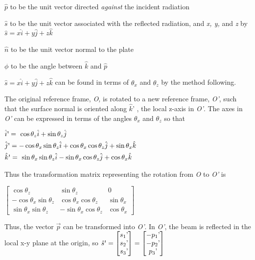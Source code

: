         $\hat{p}$ to be the unit vector directed \textit{against }the
         incident radiation

         $\hat{s}$ to be the unit vector associated with the reflected
         radiation, and \textit{x, y, }and\textit{ z }by
         $\hat{s}=x\hat{i}+y\hat{j}+z\hat{k}$

         $\hat{n}$ to be the unit vector normal to the plate

         $\phi $ to be the angle between  $\hat{k}$
         and $\hat{p}$

         $\hat{s}=x\hat{i}+y\hat{j}+z\hat{k}$ can be found in terms of  $\theta
         _{x}$ and  $\theta _{z}$ by the method following.

         \bigskip

         The original reference frame, \textit{O,} is rotated to a new
         reference frame, \textit{O'}, such that the surface normal is
         oriented along $\hat{k}\text{'}$ , the local z{}-axis in
         \textit{O'}.  The axes in
         \textit{O'} can be expressed in terms of the
         angles $\theta _{x}$ and  $\theta _{z}$ so that

         $\begin{gathered}\hat{i}\text{{\textquotesingle}}=\ \cos \theta
         _{z}\hat{i}+\sin \theta _{z}\hat{j}\hfill
         \\\hat{j}\text{{\textquotesingle}}=-\cos \theta _{x}\sin \theta
         _{z}\hat{i}+\cos \theta _{x}\cos \theta _{z}\hat{j}+\sin \theta
         _{x}\hat{k}\hfill \\\hat{k}\text{{\textquotesingle}}=\ \sin \theta
         _{x}\sin \theta _{z}\hat{i}-\sin \theta _{x}\cos \theta
         _{z}\hat{j}+\cos \theta _{x}\hat{k}\hfill \end{gathered}$

         Thus the transformation matrix representing the rotation from
         \textit{O} to \textit{O'} is

         $\left[\begin{matrix}\cos \theta _{z}&\sin \theta _{z}&0\\-\cos
         \theta _{x}\sin \theta _{z}&\cos \theta _{x}\cos \theta _{z}&\sin
         \theta _{x}\\\sin \theta _{x}\sin \theta _{z}&-\sin \theta _{x}\cos
         \theta _{z}&\cos \theta _{x}\end{matrix}\right]$

         \bigskip

         Thus, the vector  $\vec{p}$ can be transformed into \textit{O'}. In
         \textit{O'}, the beam is reflected in the
         local x{}-y plane at the origin, so
         $\hat{s}\text{{\textquotesingle}} = \left[\begin{matrix}s_{1}
         \text{'}\\s_{2}\text{'}\\s_{3}\text{'}\end{matrix} \right] =
         \left[\begin{matrix}-p_{1}\text{'}\\-p_{2}\text{'}\\p_{3}\text{'}
         \end{matrix} \right]$


